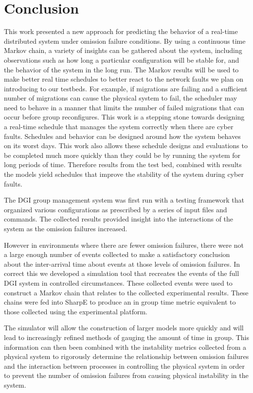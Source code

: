 \chapter{Conclusion}

This work presented a new approach for predicting the behavior of a real-time
distributed system under omission failure conditions. By using a continuous time
Markov chain, a variety of insights can be gathered about the system, including
observations such as how long a particular configuration will be stable for,
and the behavior of the system in the long run.  The Markov results will be used
 to make better real time schedules to better react to the network faults we
plan on introducing to our testbeds. For example, if migrations are failing
and a sufficient number of migrations can cause the physical system to fail,
the scheduler may need to behave in a manner that limits the number of failed
migrations that can occur before group reconfigures. This work is a stepping
stone towards designing a real-time schedule that manages the system correctly
when there are cyber faults. Schedules and behavior can be designed around how
the system behaves on its worst days. This work also allows these schedule designs
and evaluations to be completed much more quickly than they could be by running
the system for long periods of time. Therefore results from the test bed, combined
with results the models yield schedules that improve the stability of the
system during cyber faults.


The DGI group management system was first run with a testing framework that organized various configurations as prescribed by a series of input files and commands. The collected results provided insight into the interactions of the system as the omission failures increased.

However in environments where there are fewer omission failures, there were not a large enough number of events collected to make a satisfactory conclusion about the inter-arrival time about events at those levels of omission failures. In correct this we developed a simulation tool that recreates the events of the full DGI system in controlled circumstances. These collected events were used to construct a Markov chain that relates to the collected experimental results. These chains were fed into SharpE to produce an in group time metric equivalent to those collected using the experimental platform.

The simulator will allow the construction of larger models more quickly and will lead to increasingly refined methods of gauging the amount of time in group. This information can then been combined with the instability metrics collected from a physical system to rigorously determine the relationship between omission failures and the interaction between processes in controlling the physical system in order to prevent the number of omission failures from causing physical instability in the system.


